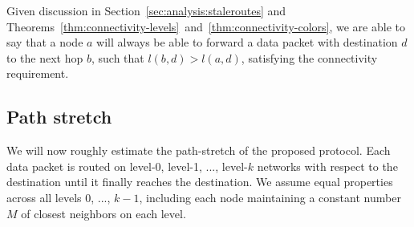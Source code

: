 \documentclass[conference]{IEEEtran}
\theoremstyle{definition}
\begin{document}
Given discussion in Section~\ref{sec:analysis:staleroutes} and Theorems~\ref{thm:connectivity-levels}~and~\ref{thm:connectivity-colors}, we are able to say that a node $a$ will always be able to forward a data packet with destination $d$ to the next hop $b$, such that $l(b,d) > l(a,d)$, satisfying the connectivity requirement.


\subsection{Path stretch}
\label{sec:analysis:stretch}

We will now roughly estimate the path-stretch of the proposed protocol. Each data packet is routed on level-0, level-1, ..., level-$k$ networks with respect to the destination until it finally reaches the destination. We assume equal properties across all levels 0, ..., $k - 1$, including each node maintaining a constant number $M$ of closest neighbors on each level.
\end{document}
